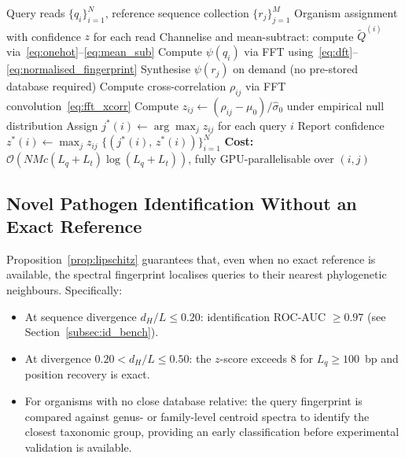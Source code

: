 \documentclass[twocolumn,11pt,a4paper]{article}
\theoremstyle{definition}
\theoremstyle{remark}
\newcommand{\bigO}{\mathcal{O}}
\begin{document}
\begin{algorithm}
\caption{Real-time pathogen identification}
\label{alg:identification}
\begin{algorithmic}[1]
\Require Query reads $\{q_i\}_{i=1}^N$, reference sequence collection $\{r_j\}_{j=1}^M$
\Ensure Organism assignment with confidence $z$ for each read
  \State Channelise and mean-subtract: compute $\widetilde{Q}^{(i)}$ via~\eqref{eq:onehot}--\eqref{eq:mean_sub}
  \State Compute $\psi(q_i)$ via FFT using~\eqref{eq:dft}--\eqref{eq:normalised_fingerprint}
\EndFor
{}
  \State Synthesise $\psi(r_j)$ on demand (no pre-stored database required)
\EndFor
{}
  \State Compute cross-correlation $\rho_{ij}$ via FFT convolution~\eqref{eq:fft_xcorr}
  \State Compute $z_{ij} \leftarrow (\rho_{ij} - \mu_0)/\hat{\sigma}_0$ under empirical null distribution
\EndFor
\State Assign $j^*(i) \leftarrow \arg\max_j z_{ij}$ for each query $i$
\State Report confidence $z^*(i) \leftarrow \max_j z_{ij}$
\State \Return $\{(j^*(i),\, z^*(i))\}_{i=1}^N$
\State \textbf{Cost:} $\bigO(N M c (L_q + L_t)\log(L_q + L_t))$, fully GPU-parallelisable over $(i,j)$
\end{algorithmic}
\end{algorithm}

\subsection{Novel Pathogen Identification Without an Exact Reference}

Proposition~\ref{prop:lipschitz} guarantees that, even when no exact reference
is available, the spectral fingerprint localises queries to their nearest
phylogenetic neighbours. Specifically:
\begin{itemize}
\item At sequence divergence $d_H/L \leq 0.20$: identification ROC-AUC
  $\geq 0.97$ (see Section~\ref{subsec:id_bench}).
\item At divergence $0.20 < d_H/L \leq 0.50$: the $z$-score exceeds 8 for
  $L_q \geq 100$~bp and position recovery is exact.
\item For organisms with no close database relative: the query fingerprint is
  compared against genus- or family-level centroid spectra to identify the
  closest taxonomic group, providing an early classification before experimental
  validation is available.
\end{itemize}
\end{document}
